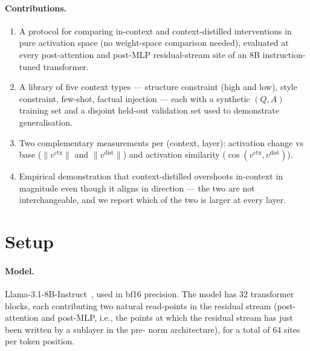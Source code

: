 \documentclass{article}
\begin{document}
\paragraph{Contributions.}
\begin{enumerate}
\item A protocol for comparing in-context and context-distilled
  interventions in pure activation space (no weight-space comparison
  needed), evaluated at every post-attention and post-MLP
  residual-stream site of an 8B instruction-tuned transformer.
\item A library of five context types --- structure constraint (high
  and low), style constraint, few-shot, factual injection --- each with
  a synthetic $(Q, A)$ training set and a disjoint held-out validation
  set used to demonstrate generalisation.
\item Two complementary measurements per (context, layer): activation
  change vs base ($\|v^\text{ctx}\|$ and $\|v^\text{dist}\|$) and
  activation similarity ($\cos(v^\text{ctx}, v^\text{dist})$).
\item Empirical demonstration that context-distilled overshoots
  in-context in magnitude even though it aligns in direction --- the
  two are not interchangeable, and we report which of the two is
  larger at every layer.
\end{enumerate}

\section{Setup}
\label{sec:setup}

\paragraph{Model.}
Llama-3.1-8B-Instruct~\citep{dubey2024llama}, used in bf16 precision. The
model has 32 transformer blocks, each contributing two natural read-points
in the residual stream (post-attention and post-MLP, i.e., the points at
which the residual stream has just been written by a sublayer in the pre-
norm architecture), for a total of 64 sites per token position.
\end{document}
